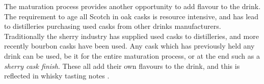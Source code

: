 The maturation process provides another opportunity to add flavour to the drink.  The requirement to age all Scotch in 
oak casks is resource intensive, and has lead to distilleries purchasing used casks from other drinks manufacturers.
Traditionally the sherry industry has supplied used casks to distilleries, and more recently bourbon casks have been 
used.  Any cask which has previously held any drink can be used, be it for the entire maturation process, or at the end
such as a \emph{sherry cask finish}.  These all add their own flavours to the drink, and this is reflected in whisky
tasting notes \cite{Jacques2003, Mosedale1998}.